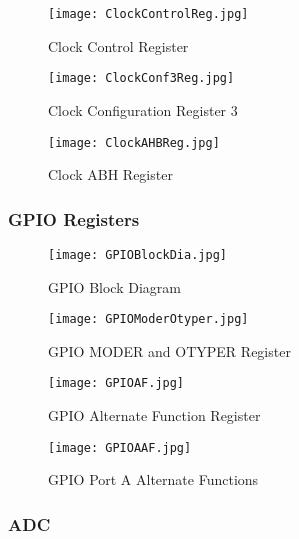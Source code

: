 \begin{figure}[hbt!]
	\texttt{[image: ClockControlReg.jpg]}
	\caption{Clock Control Register}
	\label{fig:ClockControlReg}
\end{figure}

\begin{figure}[hbt!]
	\texttt{[image: ClockConf3Reg.jpg]}
	\caption{Clock Configuration Register 3}
	\label{fig:ClockConf3Reg}
\end{figure}

\pagebreak

\begin{figure}[hbt!]
	\texttt{[image: ClockAHBReg.jpg]}
	\caption{Clock ABH Register}
	\label{fig:ClockAHBReg}
\end{figure}

\pagebreak

\subsubsection{GPIO Registers}
\label{subsec:GpioReg}

\begin{figure}[hbt!]
	\texttt{[image: GPIOBlockDia.jpg]}
	\caption{GPIO Block Diagram}
	\label{fig:GPIOBlockDia}
\end{figure}

\pagebreak

\begin{figure}[hbt!]
	\texttt{[image: GPIOModerOtyper.jpg]}
	\caption{GPIO MODER and OTYPER Register}
	\label{fig:GPIOModerOtyper}
\end{figure}

\pagebreak

\begin{figure}[hbt!]
	\texttt{[image: GPIOAF.jpg]}
	\caption{GPIO Alternate Function Register}
	\label{fig:GPIOAF}
\end{figure}

\begin{figure}[hbt!]
	\texttt{[image: GPIOAAF.jpg]}
	\caption{GPIO Port A Alternate Functions}
	\label{fig:GPIOAAF}
\end{figure}

\pagebreak

\subsubsection{ADC}
\label{subsec:AdcReg}

